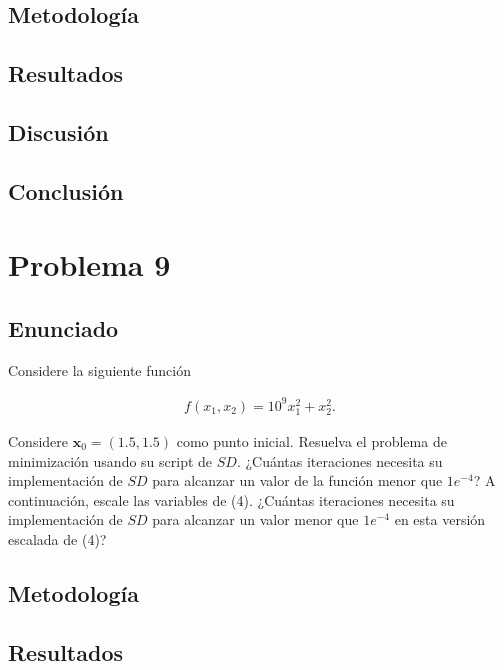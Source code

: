 \documentclass{article}
\begin{document}
\subsection{Metodología}

\subsection{Resultados}
\setcounter{equation}{0}

\subsection{Discusión}

\subsection{Conclusión}

\section{Problema 9}

\subsection{Enunciado}
Considere la siguiente función

\begin{align}
    f(x_1, x_2) = 10^{9}x_1^{2} + x_2^{2}. \tag{4}
\end{align}

Considere $\mathbf{x}_0 = (1.5, 1.5)$ como punto inicial. Resuelva el problema de minimización usando su script de $SD$. ¿Cuántas iteraciones necesita su implementación de $SD$ para alcanzar un valor de la función menor que $1e^{-4}$? A continuación, escale las variables de (4). ¿Cuántas iteraciones necesita su implementación de $SD$ para alcanzar un valor menor que $1e^{-4}$ en esta versión escalada de (4)?


\subsection{Metodología}

\subsection{Resultados}
\setcounter{equation}{0}
\end{document}

